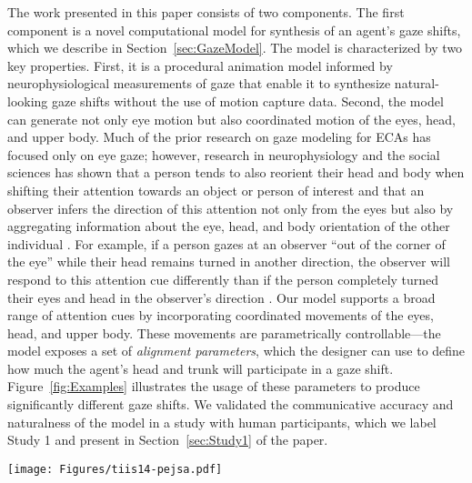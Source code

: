 The work presented in this paper consists of two components. The first component is a novel computational model for synthesis of an agent's gaze shifts, which we describe in Section~\ref{sec:GazeModel}. The model is characterized by two key properties. First, it is a procedural animation model informed by neurophysiological measurements of gaze that enable it to synthesize natural-looking gaze shifts without the use of motion capture data. Second, the model can generate not only eye motion but also coordinated motion of the eyes, head, and upper body. Much of the prior research on gaze modeling for ECAs has focused only on eye gaze; however, research in neurophysiology and the social sciences has shown that a person tends to also reorient their head and body when shifting their attention towards an object or person of interest and that an observer infers the direction of this attention not only from the eyes but also by aggregating information about the eye, head, and body orientation of the other individual \cite{perrett1994understanding,hietanen1999does,hietanen2002social,pomianowska2011socialcues}. For example, if a person gazes at an observer ``out of the corner of the eye'' while their head remains turned in another direction, the observer will respond to this attention cue differently than if the person completely turned their eyes and head in the observer's direction \cite{hietanen1999does}. Our model supports a broad range of attention cues by incorporating coordinated movements of the eyes, head, and upper body. These movements are parametrically controllable---the model exposes a set of \emph{alignment parameters}, which the designer can use to define how much the agent's head and trunk will participate in a gaze shift. Figure~\ref{fig:Examples} illustrates the usage of these parameters to produce significantly different gaze shifts. We validated the communicative accuracy and naturalness of the model in a study with human participants, which we label Study 1 and present in Section~\ref{sec:Study1} of the paper.

\begin{figure*}
\centering
\texttt{[image: Figures/tiis14-pejsa.pdf]}
\caption{Examples of gaze shifts synthesized using our model: (1) Initially the agent maintains eye contact with the observer.  (2) Gaze shift to the side with low value of the head alignment parameter. (3) Gaze shift in the same direction, but with high head alignment value. (4) Gaze shift in the same direction with a small amount of trunk motion. (5) As before, but with a high amount of trunk motion.}
\label{fig:Examples}
\end{figure*}

